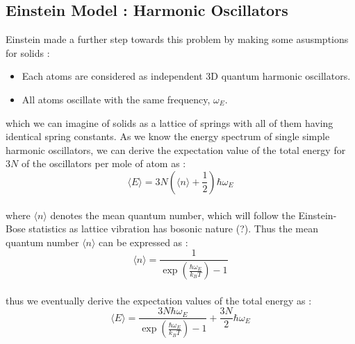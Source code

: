 \documentclass[paper=a4, fontsize=11pt]{scrartcl}
\newcommand{\boltz}{k_B}
\newcommand{\expval}[1]{\langle #1 \rangle}
\begin{document}
\vspace{0.15in}
\subsection{Einstein Model : Harmonic Oscillators}
\vspace{0.15in}

Einstein made a further step towards this problem by making some asusmptions for solids : \\

\begin{itemize}
	\item Each atoms are considered as independent 3D quantum harmonic oscillators. 
	\item All atoms oscillate with the same frequency, $\omega_E$.\\
\end{itemize}

which we can imagine of solids as a lattice of springs with all of them having identical spring constants. As we know the energy spectrum of single simple harmonic oscillators, we can derive the expectation value of the total energy for $3N$ of the oscillators per mole of atom as : \\

\begin{equation}\nonumber
	\expval{E} = 3N \left( \expval{n} + \frac{1}{2}  \right) \hbar \omega_E
\end{equation}\\

where $\expval{n}$ denotes the mean quantum number, which will follow the Einstein-Bose statistics as lattice vibration has bosonic nature (?). Thus the mean quantum number $\expval{n}$ can be expressed as : \\

\begin{equation}\nonumber
	\expval{n} = \frac{1}{\exp(\frac{\hbar \omega_E}{\boltz T})-1}
\end{equation}\\

thus we eventually derive the expectation values of the total energy as : \\

\begin{equation}\nonumber
		\expval{E} =   \frac{3N  \hbar \omega_E }{\exp(\frac{\hbar \omega_E}{\boltz T})-1}   + \frac{3N}{2}  \hbar \omega_E
\end{equation} \\
\end{document}
